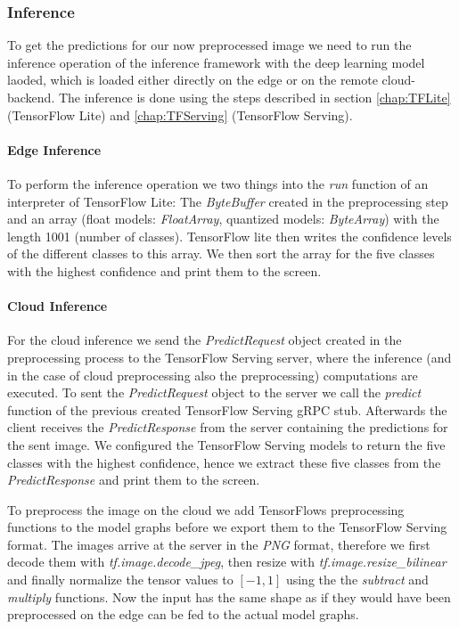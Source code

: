 

\subsubsection{Inference}
To get the predictions for our now preprocessed image we need to run the inference operation of the inference framework with the deep learning model laoded, which is loaded either directly on the edge or on the remote cloud-backend. 
The inference is done using the steps described in section \ref{chap:TFLite} (TensorFlow Lite) and \ref{chap:TFServing} (TensorFlow Serving).
\paragraph{Edge Inference}
To perform the inference operation we two things into the \emph{run} function of an interpreter of TensorFlow Lite: The \emph{ByteBuffer} created in the preprocessing step and an array (float models: \emph{FloatArray}, quantized models: \emph{ByteArray}) with the length 1001 (number of classes). TensorFlow lite then writes the confidence levels of the different classes to this array. We then sort the array for the five classes with the highest confidence and print them to the screen.

\paragraph{Cloud Inference}

For the cloud inference we send the \emph{PredictRequest} object created in the preprocessing process to the TensorFlow Serving server, where the inference (and in the case of cloud preprocessing also the preprocessing) computations are executed.
To sent the \emph{PredictRequest} object to the server we call the \emph{predict} function of the previous created TensorFlow Serving gRPC stub.
Afterwards the client receives the \emph{PredictResponse} from the server containing the predictions for the sent image. We configured the TensorFlow Serving models to return the five classes with the highest confidence, hence we extract these five classes from the \emph{PredictResponse} and print them to the screen.

To preprocess the image on the cloud we add TensorFlows preprocessing functions to the model graphs before we export them to the TensorFlow Serving format. The images arrive at the server in the \emph{PNG} format, therefore we first decode them with \emph{tf.image.decode\_jpeg}, then resize with \emph{tf.image.resize\_bilinear} and finally normalize the tensor values to $[-1,1]$ using the the \emph{subtract} and \emph{multiply} functions. Now the input has the same shape as if they would have been preprocessed on the edge can be fed to the actual model graphs.
